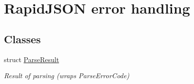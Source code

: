 \hypertarget{group___r_a_p_i_d_j_s_o_n___e_r_r_o_r_s}{}\section{Rapid\+J\+S\+ON error handling}
\label{group___r_a_p_i_d_j_s_o_n___e_r_r_o_r_s}
\subsection*{Classes}
\begin{DoxyCompactItemize}
\item 
struct \hyperlink{struct_parse_result}{Parse\+Result}
\begin{DoxyCompactList}\small\item\em Result of parsing (wraps Parse\+Error\+Code) \end{DoxyCompactList}\end{DoxyCompactItemize}
